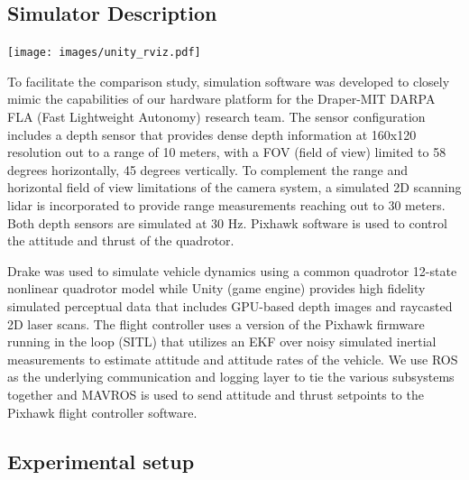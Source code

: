 \documentclass{llncs}
\begin{document}
\subsection{Simulator Description}
\begin{center}
  \texttt{[image: images/unity\_rviz.pdf]}
  \label{success_heatmap}%
\end{center}
To facilitate the comparison study, simulation software was developed to closely mimic the capabilities of our hardware platform for the Draper-MIT DARPA FLA (Fast Lightweight Autonomy) research team.  The sensor configuration includes a depth sensor that provides dense depth information at 160x120 resolution out to a range of 10 meters, with a FOV (field of view) limited to 58 degrees horizontally, 45 degrees vertically.  To complement the range and horizontal field of view limitations of the camera system, a simulated 2D scanning lidar is incorporated to provide range measurements reaching out to 30 meters.  Both depth sensors are simulated at 30 Hz.  Pixhawk software is used to control the attitude and thrust of the quadrotor.

Drake was used to simulate vehicle dynamics using a common quadrotor 12-state nonlinear quadrotor model while Unity (game engine) provides high fidelity simulated perceptual data that includes GPU-based depth images and raycasted 2D laser scans.  The flight controller uses a version of the Pixhawk firmware running in the loop (SITL) that utilizes an EKF over noisy simulated inertial measurements to estimate attitude and attitude rates of the vehicle. We use ROS as the underlying communication and logging layer to tie the various subsystems together and MAVROS is used to send attitude and thrust setpoints to the Pixhawk flight controller software.

\subsection{Experimental setup}
\end{document}
